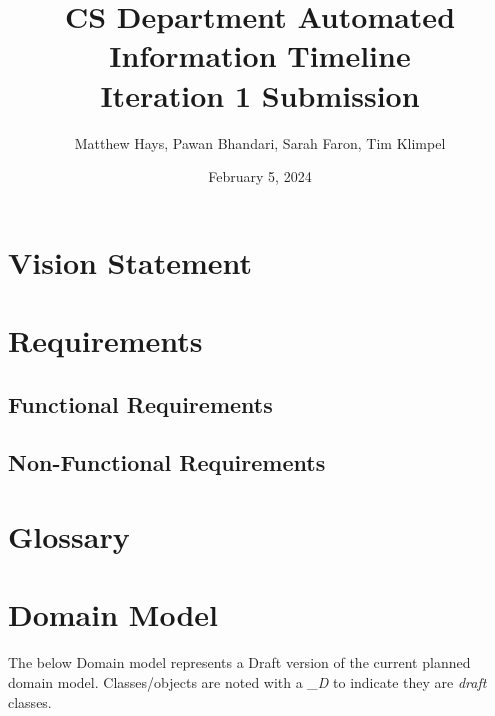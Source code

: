 \documentclass{article}
\title{CS Department Automated Information Timeline \\ Iteration 1 Submission}
\date{February 5, 2024}
\author{Matthew Hays, Pawan Bhandari, Sarah Faron, Tim Klimpel}
\begin{document}
\maketitle
\newpage
\tableofcontents
\listoffigures
\newpage
\section{Vision Statement}


\section{Requirements}
\subsection{Functional Requirements}


\subsection{Non-Functional Requirements}


\section{Glossary} \label{sec:Glossary}


\section{Domain Model}

The below Domain model represents a Draft version of the current planned domain model.  Classes/objects are noted with a \textit{\_D} to indicate they are \textit{draft} classes.
\end{document}
